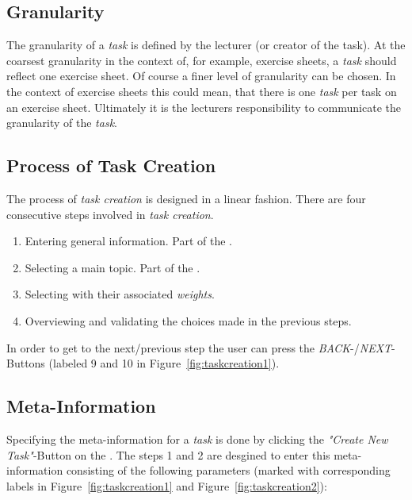 \subsection{Granularity}
The granularity of a \textit{task} is defined by the lecturer (or creator of the task). At the coarsest granularity in the context of, for example, exercise sheets, a \textit{task} should reflect one exercise sheet. Of course a finer level of granularity can be chosen. In the context of exercise sheets this could mean, that there is one \textit{task} per task on an exercise sheet. Ultimately it is the lecturers responsibility to communicate the granularity of the \textit{task}.

\subsection{Process of Task Creation}
The process of \textit{task creation} is designed in a linear fashion. There are four consecutive steps involved in \textit{task creation}.

\begin{enumerate}
  \item Entering general information. Part of the .
  \item Selecting a main topic. Part of the .
  \item Selecting  with their associated \textit{weights}.
  \item Overviewing and validating the choices made in the previous steps.
\end{enumerate}

In order to get to the next/previous step the user can press the \textit{BACK}-/\textit{NEXT}-Buttons (labeled 9 and 10 in Figure~\ref{fig:taskcreation1}).

\subsection{Meta-Information}
\label{sub:metainfo}
Specifying the meta-information for a \textit{task} is done by clicking the \textit{"Create New Task"}-Button on the .
The steps 1 and 2 are desgined to enter this meta-information consisting of the following parameters (marked with corresponding labels 
in Figure~\ref{fig:taskcreation1} and Figure~\ref{fig:taskcreation2}):

